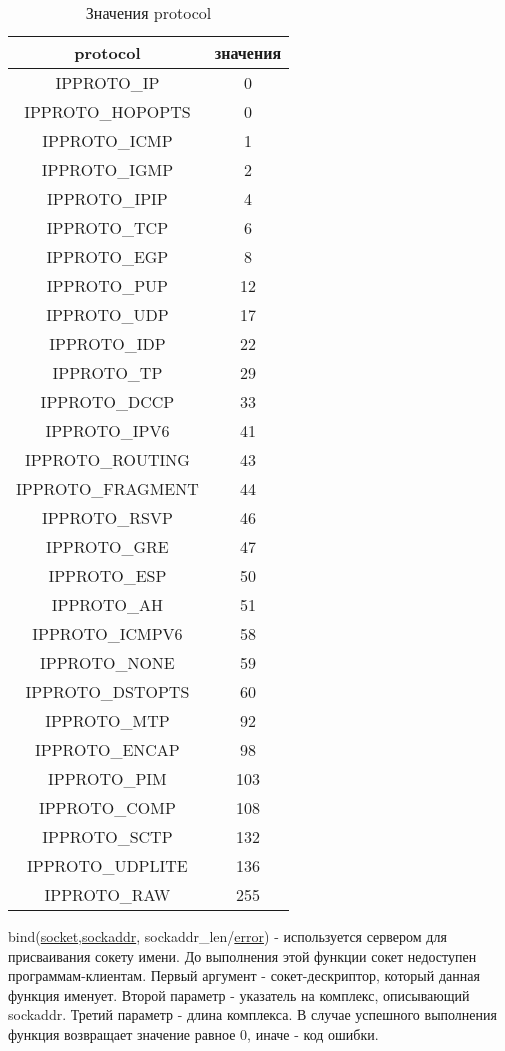 \documentclass[12t]{article}
\begin{document}
\begin{table}[H]
\caption{\label{protocol}Значения protocol}
\begin{center}
\begin{tabular}{|c|c|}
\hline
protocol & значения \\
\hline
IPPROTO\_IP & 0 \\
IPPROTO\_HOPOPTS & 0 \\
IPPROTO\_ICMP & 1 \\
IPPROTO\_IGMP & 2 \\
IPPROTO\_IPIP & 4 \\
IPPROTO\_TCP & 6 \\
IPPROTO\_EGP & 8 \\
IPPROTO\_PUP & 12 \\
IPPROTO\_UDP & 17 \\
IPPROTO\_IDP & 22 \\
IPPROTO\_TP & 29 \\
IPPROTO\_DCCP & 33 \\
IPPROTO\_IPV6 & 41 \\
IPPROTO\_ROUTING & 43 \\
IPPROTO\_FRAGMENT & 44 \\
IPPROTO\_RSVP & 46 \\
IPPROTO\_GRE & 47 \\
IPPROTO\_ESP & 50 \\
IPPROTO\_AH & 51 \\
IPPROTO\_ICMPV6 & 58 \\
IPPROTO\_NONE & 59 \\
IPPROTO\_DSTOPTS & 60 \\
IPPROTO\_MTP & 92 \\
IPPROTO\_ENCAP & 98 \\
IPPROTO\_PIM & 103 \\
IPPROTO\_COMP & 108 \\
IPPROTO\_SCTP & 132 \\
IPPROTO\_UDPLITE & 136 \\
IPPROTO\_RAW & 255 \\
\hline
\end{tabular}
\end{center}
\end{table}

\label{bind}
bind(\hyperref[socket]{socket},\hyperref[sockaddr]{sockaddr}, sockaddr\_len/\hyperref[error]{error}) - используется сервером для присваивания сокету имени. До выполнения этой функции сокет недоступен программам-клиентам. Первый аргумент - сокет-дескриптор, который данная функция именует. Второй параметр - указатель на комплекс, описывающий sockaddr. Третий параметр - длина комплекса. В случае успешного выполнения функция возвращает значение равное 0, иначе - код ошибки.
\end{document}
